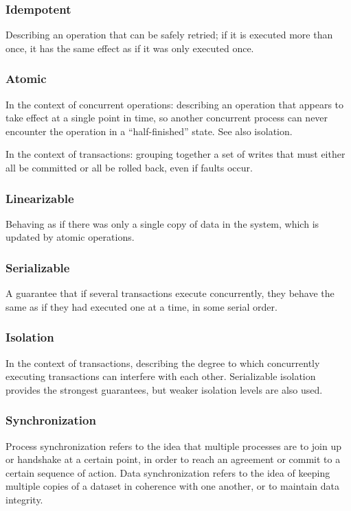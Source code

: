 \documentclass{article}
\begin{document}
    \subsubsection{Idempotent}
    Describing an operation that can be safely retried; if it is executed more than once, it has the same effect as if it was only executed once.
    
    \subsubsection{Atomic}
    In the context of concurrent operations: describing an operation that appears to take effect at a single point in time, so another concurrent process can never encounter the operation in a ``half-finished” state. See also isolation.
    
    In the context of transactions: grouping together a set of writes that must either all be committed or all be rolled back, even if faults occur.
    
    \subsubsection{Linearizable}
    Behaving as if there was only a single copy of data in the system, which is updated by atomic operations.
    
    \subsubsection{Serializable}
    A guarantee that if several transactions execute concurrently, they behave the same as if they had executed one at a time, in some serial order.
    
    
    \subsubsection{Isolation}
    In the context of transactions, describing the degree to which concurrently executing transactions can interfere with each other. Serializable isolation provides the strongest guarantees, but weaker isolation levels are also used.
    
    \subsubsection{Synchronization}
    Process synchronization refers to the idea that multiple processes are to join up or handshake at a certain point, in order to reach an agreement or commit to a certain sequence of action. Data synchronization refers to the idea of keeping multiple copies of a dataset in coherence with one another, or to maintain data integrity.
    
\end{document}

